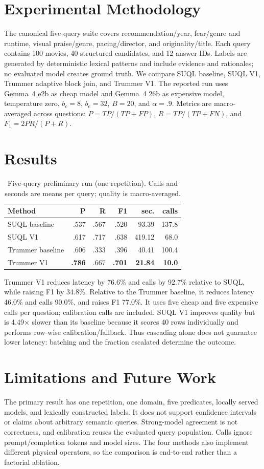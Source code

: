 \documentclass[sigconf,review]{acmart}
\begin{document}
\section{Experimental Methodology}
The canonical five-query suite covers recommendation/year, fear/genre and
runtime, visual praise/genre, pacing/director, and originality/title. Each query
contains 100 movies, 40 structured candidates, and 12 answer IDs. Labels are
generated by deterministic lexical patterns and include evidence and rationales;
no evaluated model creates ground truth. We compare SUQL baseline, SUQL V1,
Trummer adaptive block join, and Trummer V1. The reported run uses Gemma~4 e2b
as cheap model and Gemma~4 26b as expensive model, temperature zero, $b_c=8$,
$b_e=32$, $B=20$, and $\alpha=.9$. Metrics are macro-averaged across questions:
$P=TP/(TP+FP)$, $R=TP/(TP+FN)$, and $F_1=2PR/(P+R)$.

\section{Results}
\begin{table}[t]
\caption{Five-query preliminary run (one repetition). Calls and seconds are means per query; quality is macro-averaged.}
\label{tab:results}\centering\small
\begin{tabular}{lrrrrr}\toprule
Method&P&R&F1&sec.&calls\\\midrule
SUQL baseline&.537&.567&.520&93.39&137.8\\
SUQL V1&.617&.717&.638&419.12&68.0\\
Trummer baseline&.606&.333&.396&40.41&100.4\\
Trummer V1&\textbf{.786}&.667&\textbf{.701}&\textbf{21.84}&\textbf{10.0}\\\bottomrule
\end{tabular}
\end{table}
Trummer V1 reduces latency by 76.6\% and calls by 92.7\% relative to SUQL,
while raising F1 by 34.8\%. Relative to the Trummer baseline, it reduces latency
46.0\% and calls 90.0\%, and raises F1 77.0\%. It uses five cheap and five
expensive calls per question; calibration calls are included. SUQL V1 improves
quality but is 4.49$\times$ slower than its baseline because it scores 40 rows
individually and performs row-wise calibration/fallback. Thus cascading alone
does not guarantee lower latency: batching and the fraction escalated determine
the outcome.

\section{Limitations and Future Work}
The primary result has one repetition, one domain, five predicates, locally
served models, and lexically constructed labels. It does not support confidence
intervals or claims about arbitrary semantic queries. Strong-model agreement is
not correctness, and calibration reuses the evaluated query population. Calls
ignore prompt/completion tokens and model sizes. The four methods also implement
different physical operators, so the comparison is end-to-end rather than a
factorial ablation.
\end{document}
